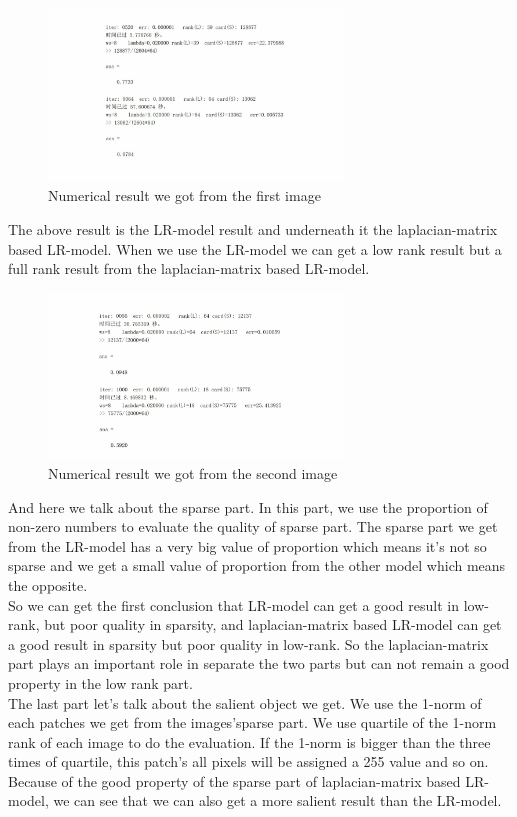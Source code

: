 \documentclass{article}
\begin{document}
\begin{figure}[htbp]
	\centering
	\includegraphics[width=0.70\textwidth]{img1result.pdf}
	\caption{Numerical result we got from the first image}
\end{figure} 
The above result is the LR-model result and underneath it the laplacian-matrix 
based LR-model. When we use the LR-model we can get a low rank result but a 
full rank result from the laplacian-matrix based LR-model. 
\begin{figure}[htbp]
	\centering
	\includegraphics[width=0.70\textwidth]{img2result.pdf}
	\caption{Numerical result we got from the second image}
\end{figure}
And here we talk about the sparse part. In this part, we use the proportion of 
non-zero numbers to evaluate the quality of sparse part. The sparse part we get 
from the LR-model has a very big value of proportion which means it's not so 
sparse and we get a small value of proportion from the other model which means 
the opposite. \\
So we can get the first conclusion that LR-model can get a good result in 
low-rank, but poor quality in sparsity, and laplacian-matrix based LR-model can 
get a good result in sparsity but poor quality in low-rank. So the 
laplacian-matrix part plays an important role in separate the two parts but can 
not remain a good property in the low rank part.\\
The last part let's talk about the salient object we get. We use the 1-norm of 
each patches we get from the images'sparse part. We use quartile of the 1-norm 
rank of each image to do the evaluation. If the 1-norm is bigger than the three 
times of quartile, this patch's all pixels will be assigned a 255 value and so 
on. Because of the good property of the sparse part of laplacian-matrix based 
LR-model, we can see that we can also get a more salient result than the 
LR-model.\\
\end{document}
